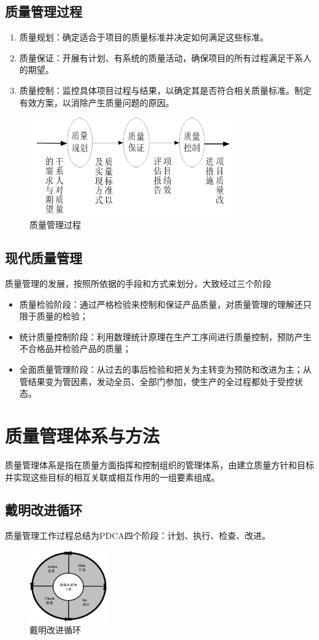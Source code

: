 \subsection{质量管理过程}
\begin{enumerate}
	\item 质量规划：确定适合于项目的质量标准并决定如何满足这些标准。
	\item 质量保证：开展有计划、有系统的质量活动，确保项目的所有过程满足干系人的期望。
	\item 质量控制：监控具体项目过程与结果，以确定其是否符合相关质量标准。制定有效方案，以消除产生质量问题的原因。
\end{enumerate}
\begin{figure}[!h]
	\centering
	\includegraphics[width=0.8\textwidth]{image/7-1}
	\caption{质量管理过程}
\end{figure}
\subsection{现代质量管理}
质量管理的发展，按照所依据的手段和方式来划分，大致经过三个阶段
\begin{itemize}
	\item 质量检验阶段：通过严格检验来控制和保证产品质量，对质量管理的理解还只限于质量的检验；
	\item 统计质量控制阶段：利用数理统计原理在生产工序间进行质量控制，预防产生不合格品并检验产品的质量；
	\item 全面质量管理阶段：从过去的事后检验和把关为主转变为预防和改进为主；从管结果变为管因素，发动全员、全部门参加，使生产的全过程都处于受控状态。
\end{itemize}
\section{质量管理体系与方法}
质量管理体系是指在质量方面指挥和控制组织的管理体系，由建立质量方针和目标并实现这些目标的相互关联或相互作用的一组要素组成。
\subsection{戴明改进循环}
质量管理工作过程总结为PDCA四个阶段：计划、执行、检查、改进。
\begin{figure}[!h]
	\centering
	\includegraphics[width=0.3\textwidth]{image/7-2}
	\caption{戴明改进循环}
\end{figure}
